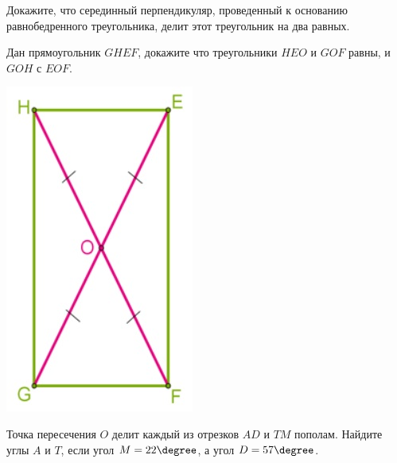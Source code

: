\begin{class}[number=5]
\begin{listofex}[resume]
\begin{minipage}[c]{0.34\linewidth}
		\end{minipage}
		\item Докажите, что серединный перпендикуляр, проведенный к основанию равнобедренного треугольника, делит этот треугольник на два равных.
		\item
		\begin{minipage}[t]{0.73\linewidth}
			Дан прямоугольник \(GHEF\), докажите что треугольники \(HEO\) и \(GOF\) равны, и \(GOH\) с \(EOF\).
		\end{minipage}
		\hspace{0.03\linewidth}
		\begin{minipage}[c]{0.24\linewidth}
			\includegraphics[width=0.7\linewidth]{pics/G71M4C5-1.jpg}
		\end{minipage}
		\item
		\begin{minipage}[t]{0.45\linewidth}
			Точка пересечения \( O \) делит каждый из отрезков \( AD \) и \( TM \) пополам. Найдите углы \(A\) и \(T\), если угол \(M = 22 \degree\), а угол \(D = 57 \degree\).
		\end{minipage}

\end{listofex}
\end{class}
